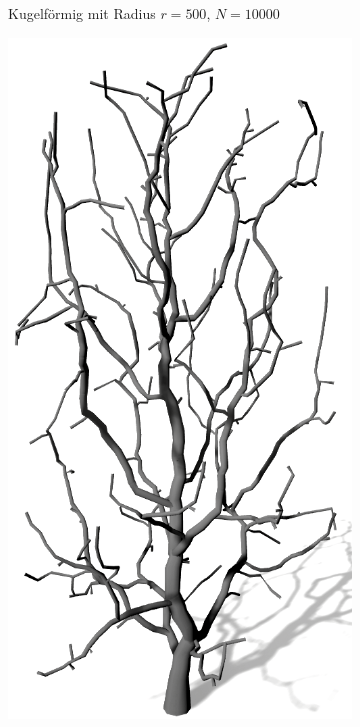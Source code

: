 \begin{figure} [hbtp]
\begin{subfigure}[t]{.45\textwidth}
		\caption{Kugelförmig mit Radius $r = 500$, $N = 10000$}
		\label{subfig:SCA_Einfluss_Sphere_High}
	\end{subfigure}	
	\begin{subfigure}[t]{.45\textwidth}
		\centering
		\includegraphics[height=.25\textheight]{images/SCA_Einfluss_Cylinder_Low.png}

\end{subfigure}
\end{figure}
